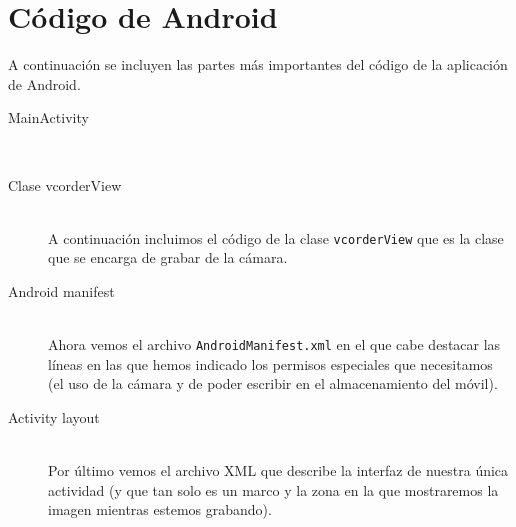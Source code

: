 \documentclass[a4paper,openright, 12pt]{book}
\begin{document}
\appendix
\chapter{Código de Android}
A continuación se incluyen las partes más importantes del código de la aplicación de Android.
\begin{description}

\item [MainActivity] \hfill \\


\newpage
\item [Clase vcorderView] \hfill \\
A continuación incluimos el código de la clase \lstinline|vcorderView| que es la clase que se encarga de grabar de la cámara.


\item [Android manifest] \hfill \\
Ahora vemos el archivo \lstinline|AndroidManifest.xml| en el que cabe destacar las líneas en las que hemos indicado los permisos especiales que necesitamos (el uso de la cámara y de poder escribir en el almacenamiento del móvil).


\item [Activity layout] \hfill \\
Por último vemos el archivo XML que describe la interfaz de nuestra única actividad (y que tan solo es un marco y la zona en la que mostraremos la imagen mientras estemos grabando).

\end{description}




\cleardoublepage
{}
\end{document}
